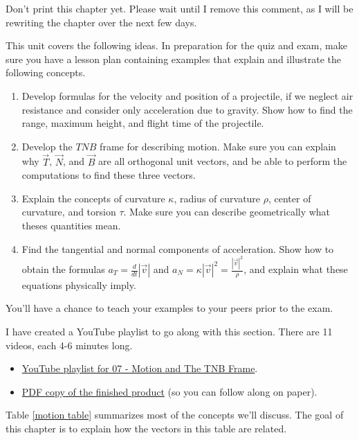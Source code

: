 {\huge
Don't print this chapter yet.  Please wait until I remove this comment, as I will be rewriting the chapter over the next few days.
}

\noindent 
This unit covers the following ideas. In preparation for the quiz and exam, make sure you have a lesson plan containing examples that explain and illustrate the following concepts.  
\begin{enumerate}
 \item Develop formulas for the velocity and position of a projectile, if we neglect air resistance and consider only acceleration due to gravity. Show how to find the range, maximum height, and flight time of the projectile.
 \item Develop the $TNB$ frame for describing motion. Make sure you can explain why $\vec T$, $\vec N$, and $\vec B$ are all orthogonal unit vectors, and be able to perform the computations to find these three vectors.
 \item Explain the concepts of curvature $\kappa$, radius of curvature $\rho$, center of curvature, and torsion $\tau$. Make sure you can describe geometrically what theses quantities mean.
 \item Find the tangential and normal components of acceleration. Show how to obtain the formulas $a_T=\frac{d}{dt}|\vec v|$ and $a_N=\kappa |\vec v|^2=\frac{|\vec v|^2}{\rho}$, and explain what these equations physically imply.
\end{enumerate}
You'll have a chance to teach your examples to your peers prior to the exam.

I have created a YouTube playlist to go along with this section. There are 11 videos, each 4-6 minutes long.
\begin{itemize}
 \item \href{http://www.youtube.com/playlist?list=PL30EE81142B1ED1F0&feature=plcp}{YouTube playlist for 07 - Motion and The TNB Frame}.
 \item \href{http://db.tt/FmEGk9p5}{PDF copy of the finished product} (so you can follow along on paper).
\end{itemize}
Table \ref{motion table} summarizes most of the concepts we'll discuss. The goal of this chapter is to explain how the vectors in this table are related. 

